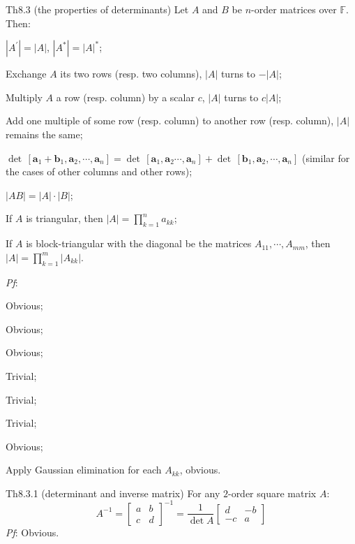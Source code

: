 \documentclass{article}
\begin{document}
\begin{Th}{Th8.3 (the properties of determinants)}
    Let $A$ and $B$ be $n$-order matrices over $\mathbb{F}$. Then:
    \begin{compactenum}
        \item $|A^\prime| = |A|$, $|A^\ast| = |A|^\ast$;
        \item Exchange $A$ its two rows (resp. two columns), $|A|$ turns to $-|A|$;
        \item Multiply $A$ a row (resp. column) by a scalar $c$, $|A|$ turns to $c|A|$;
        \item Add one multiple of some row (resp. column) to another row (resp. column), $|A|$ remains the same;
        \item $\det\, [\pmb{a}_1 + \pmb{b}_1, \pmb{a}_2,\cdots, \pmb{a}_n] = \det\,[\pmb{a}_1, \pmb{a}_2\cdots,\pmb{a}_n] + \det\,[\pmb{b}_1,\pmb{a}_2,\cdots,\pmb{a}_n]$ (similar for the cases of other columns and other rows);
        \item $|AB| = |A|\cdot |B|$;
        \item If $A$ is triangular, then $|A| = \prod_{k=1}^{n} a_{kk}$;
        \item If $A$ is block-triangular with the diagonal be the matrices $A_{11}, \cdots, A_{mm}$, then $|A| = \prod_{k=1}^{m} |A_{kk}|$.
    \end{compactenum}
    \tcblower
    \textit{Pf}: 
    \begin{compactenum}
        \item Obvious;
        \item Obvious;
        \item Obvious;
        \item Trivial;
        \item Trivial;
        \item Trivial;
        \item Obvious;
        \item Apply Gaussian elimination for each $A_{kk}$, obvious.
    \end{compactenum}
\end{Th}

\begin{Th}{Th8.3.1 (determinant and inverse matrix)}
    For any $2$-order square matrix $A$:
    $$ A^{-1} = 
    \begin{bmatrix}
        a & b \\
        c & d
    \end{bmatrix}^{-1} = \frac{1}{\det A} \begin{bmatrix}
        d & -b \\
        -c & a
    \end{bmatrix}
    $$
    \tcblower
    \textit{Pf}: Obvious.
\end{Th}
\end{document}
